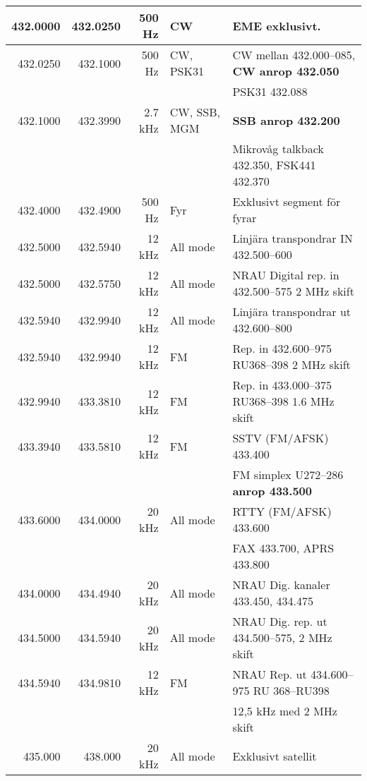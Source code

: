 \begin{landscape}
\begin{tabular}{rrrll}
432.0000 & 432.0250 & 500 Hz  & CW           & EME exklusivt.                                    \\ \hline
432.0250 & 432.1000 & 500 Hz  & CW, PSK31    & CW mellan 432.000--085, \textbf{CW anrop 432.050} \\
         &          &         &              & PSK31 432.088                                     \\ \hline
432.1000 & 432.3990 & 2.7 kHz & CW, SSB, MGM & \textbf{SSB anrop 432.200}                        \\
         &          &         &              & Mikrovåg talkback 432.350, FSK441 432.370         \\ \hline
432.4000 & 432.4900 & 500 Hz  & Fyr          & Exklusivt segment för fyrar                       \\ \hline
432.5000 & 432.5940 & 12 kHz  & All mode     & Linjära transpondrar IN 432.500--600              \\ \hline
432.5000 & 432.5750 & 12 kHz  & All mode     & NRAU Digital rep. in 432.500--575 2 MHz skift     \\ \hline
432.5940 & 432.9940 & 12 kHz  & All mode     & Linjära transpondrar ut 432.600--800              \\ \hline
432.5940 & 432.9940 & 12 kHz  & FM           & Rep. in 432.600--975 RU368--398 2 MHz skift       \\ \hline
432.9940 & 433.3810 & 12 kHz  & FM           & Rep. in 433.000--375 RU368--398 1.6 MHz skift     \\ \hline
433.3940 & 433.5810 & 12 kHz  & FM           & SSTV (FM/AFSK) 433.400                            \\
         &          &         &              & FM simplex U272--286 \textbf{anrop 433.500}       \\ \hline
433.6000 & 434.0000 & 20 kHz  & All mode     & RTTY (FM/AFSK) 433.600                            \\
         &          &         &              & FAX 433.700, APRS 433.800                         \\ \hline
434.0000 & 434.4940 & 20 kHz  & All mode     & NRAU Dig. kanaler 433.450, 434.475                \\ \hline
434.5000 & 434.5940 & 20 kHz  & All mode     & NRAU Dig. rep. ut 434.500--575, 2 MHz skift       \\ \hline
434.5940 & 434.9810 & 12 kHz  & FM           & NRAU Rep. ut 434.600--975 RU 368--RU398           \\
         &          &         &              & 12,5 kHz med 2 MHz skift                          \\ \hline
435.000  & 438.000  & 20 kHz  & All mode     & Exklusivt satellit\\
\end{tabular}


\end{landscape}
